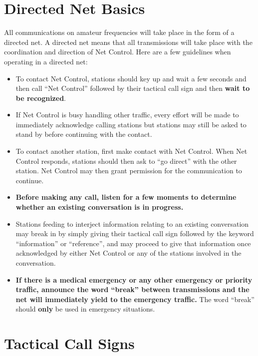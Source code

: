 \documentclass[pdflatex,letterpaper,twoside,12pt]{book}
\begin{document}
\section{Directed Net Basics}

All communications on amateur frequencies will take place in the form of a directed net.  A directed net means that all transmissions will take place with the coordination and direction of Net Control.  Here are a few guidelines when operating in a directed net:

\begin{itemize}

	\item To contact Net Control, stations should key up and wait a few seconds and then call ``Net Control'' followed by their tactical call sign and then \textbf{wait to be recognized}.
	\item If Net Control is busy handling other traffic, every effort will be made to immediately acknowledge calling stations but stations may still be asked to stand by before continuing with the contact.
	\item To contact another station, first make contact with Net Control.  When Net Control responds, stations should then ask to ``go direct'' with the other station.  Net Control may then grant permission for the communication to continue.
	\item \textbf{Before making any call, listen for a few moments to determine whether an existing conversation is in progress.}
	\item Stations feeding to interject information relating to an existing conversation may break in by simply giving their tactical call sign followed by the keyword ``information'' or ``reference'', and may proceed to give that information once acknowledged by either Net Control or any of the stations involved in the conversation.
	\item \textbf{If there is a medical emergency or any other emergency or priority traffic, announce the word ``break'' between transmissions and the net will immediately yield to the emergency traffic.}  The word ``break'' should \textbf{only} be used in emergency situations.

\end{itemize}


\section{Tactical Call Signs}
\end{document}
